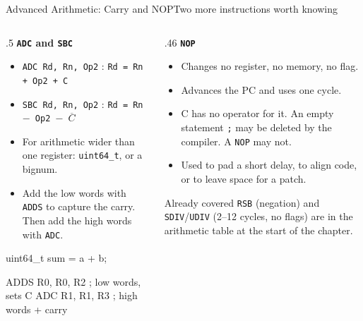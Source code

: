 \documentclass[9pt,aspectratio=169,xcolor=table]{beamer}
\begin{document}
\begin{frame}[fragile]{Advanced Arithmetic: Carry and NOP}{Two more instructions worth knowing}
    \begin{columns}[T]
    \begin{column}{.5\textwidth}
        \textbf{\texttt{ADC} and \texttt{SBC}}
        {\small
        \begin{itemize}\itemsep1pt
            \item \texttt{ADC Rd, Rn, Op2} : \texttt{Rd = Rn + Op2 + C}
            \item \texttt{SBC Rd, Rn, Op2} : \texttt{Rd = Rn $-$ Op2 $-$ $\overline{C}$}
            \item For arithmetic \alert{wider than one register}: \texttt{uint64\_t}, or a bignum.
            \item Add the low words with \texttt{ADDS} to capture the carry. Then add the high words with \texttt{ADC}.
        \end{itemize}}

        \vspace{2mm}
\begin{cc}[basicstyle=\ttfamily\footnotesize]
uint64_t sum = a + b;
\end{cc}
\begin{asm}[basicstyle=\ttfamily\footnotesize]
ADDS R0, R0, R2   ; low words, sets C
ADC  R1, R1, R3   ; high words + carry
\end{asm}
    \end{column}
    \begin{column}{.46\textwidth}
        \textbf{\texttt{NOP}}
        {\small
        \begin{itemize}\itemsep1pt
            \item Changes no register, no memory, no flag.
            \item Advances the PC and uses one cycle.
            \item C has no operator for it. An empty statement \texttt{;} may be deleted by the compiler. A \texttt{NOP} may not.
            \item Used to pad a short delay, to align code, or to leave space for a patch.
        \end{itemize}}

        \vspace{2mm}
        \begin{block}{Already covered}
            \texttt{RSB} (negation) and \texttt{SDIV}/\texttt{UDIV} (2--12 cycles, no flags) are in the arithmetic table at the start of the chapter.
        \end{block}
    \end{column}
    \end{columns}
\end{frame}
\end{document}
